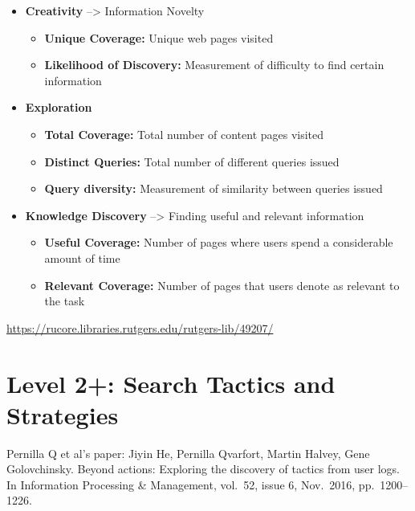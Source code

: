 \documentclass[letterpaper, nobind]{templates/ociamthesis}
\providecommand{\tightlist}{%
  \setlength{\itemsep}{0pt}\setlength{\parskip}{0pt}}
\begin{document}
\begin{itemize}
\tightlist
\item
  \textbf{Creativity} --\textgreater{} Information Novelty

  \begin{itemize}
  \tightlist
  \item
    \textbf{Unique Coverage:} Unique web pages visited
  \item
    \textbf{Likelihood of Discovery:} Measurement of difficulty to find certain information
  \end{itemize}
\item
  \textbf{Exploration}

  \begin{itemize}
  \tightlist
  \item
    \textbf{Total Coverage:} Total number of content pages visited
  \item
    \textbf{Distinct Queries:} Total number of different queries issued
  \item
    \textbf{Query diversity:} Measurement of similarity between queries issued
  \end{itemize}
\item
  \textbf{Knowledge Discovery} --\textgreater{} Finding useful and relevant information

  \begin{itemize}
  \tightlist
  \item
    \textbf{Useful Coverage:} Number of pages where users spend a considerable amount of time
  \item
    \textbf{Relevant Coverage:} Number of pages that users denote as relevant to the task
  \end{itemize}
\end{itemize}

\url{https://rucore.libraries.rutgers.edu/rutgers-lib/49207/}

\hypertarget{level-2-search-tactics-and-strategies}{%
\section{Level 2+: Search Tactics and Strategies}\label{level-2-search-tactics-and-strategies}}

Pernilla Q et al's paper: Jiyin He, Pernilla Qvarfort, Martin Halvey, Gene Golovchinsky. Beyond actions: Exploring the discovery of tactics from user logs. In Information Processing \& Management, vol.~52, issue 6, Nov.~2016, pp.~1200--1226.
\end{document}
